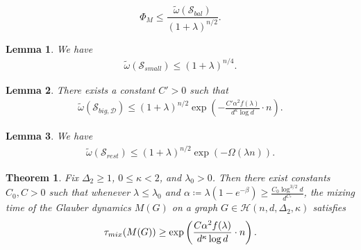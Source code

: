 \documentclass[10pt,a4paper]{amsart}
\newtheorem{theorem}{Theorem}
\newtheorem{lemma}{Lemma}
\newcommand{\cD}{\mathcal{D}}
\newcommand{\cH}{\mathcal{H}}
\newcommand{\cS}{\mathcal{S}}
\newcommand{\codeg}{\Delta_2}
\newcommand{\ex}{\kappa}
\newcommand{\exx}{C_*}
\newcommand{\lam}{\lambda}
\newcommand{\tmix}{\tau_{\rm{mix}}}
\begin{document}
\begin{equation} \label{eq:conductance_bound_weight_balanced}
    \Phi_M \leq \frac{\tilde{\omega}(\cS_{bal})}{(1+\lambda)^{n/2}}.
\end{equation}

\begin{lemma} \label{lem:small}
We have
\begin{align*}
    \tilde{\omega}(\cS_{small}) \leq (1+\lambda)^{n/4}.
\end{align*}
\end{lemma}

\begin{lemma} \label{lem:middle}
There exists a constant $C'>0$ such that
\begin{align*}
    \tilde{\omega}(\cS_{big, \cD}) \leq (1+\lambda)^{n/2} \exp\left( - \frac{C' \alpha^2 f(\lam)}{d^{\ex} \log d} \cdot n \right).
\end{align*}
\end{lemma}

\begin{lemma} \label{lem:rest}
We have
\begin{align*}
    \tilde{\omega}(\cS_{rest}) \leq (1+\lambda)^{n/2} \exp(-\Omega(\lam n)).
\end{align*}
\end{lemma}

\begin{theorem} \label{thm:slowmixing}
    Fix $\codeg \ge 1$, $0 \le \ex < 2$, and $\lam_0>0$. Then there exist constants $C_0, C > 0$ such that whenever $\lambda \le \lam_0$ and $\alpha \coloneqq \lam(1 - e^{-\beta}) \ge \frac{C_0 \log^{3/2} d}{d^{\exx}}$, the mixing time of the Glauber dynamics $M(G)$ on a graph $G \in \cH(n,d,\codeg,\ex)$ satisfies
    \[
    \tmix(M(G)) \geq \exp\left( \frac{C \alpha^2 f(\lam)}{d^{\ex} \log d} \cdot n\right).
    \]
\end{theorem}
\end{document}

